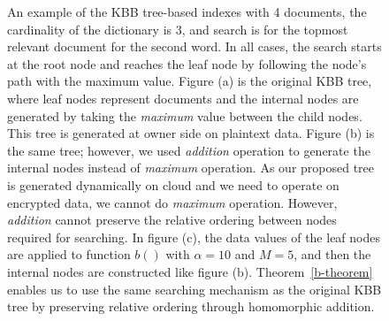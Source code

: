 \documentclass[sigconf,pdftex]{acmart}
\begin{document}
\begin{figure}[htb]
  \caption{\small{An example of the KBB tree-based indexes with 4 documents, the cardinality of the dictionary is 3, and search is for the topmost relevant document for the second word. In all cases, the search starts at the root node and reaches the leaf node by following the node's path with the maximum value. Figure (a) is the original KBB tree, where leaf nodes represent documents and the internal nodes are generated by taking the \textit{maximum} value between the child nodes. This tree is generated at owner side on plaintext data. Figure (b) is the same tree; however, we used \textit{addition} operation to generate the internal nodes instead of \textit{maximum} operation. As our proposed tree is generated dynamically on cloud and we need to operate on encrypted data, we cannot do \textit{maximum} operation. However, \textit{addition} cannot preserve the relative ordering between nodes required for searching. In figure (c), the data values of the leaf nodes are applied to function $b()$ with $\alpha = 10$ and $M = 5$, and then the internal nodes are constructed like figure (b). Theorem~\ref{b-theorem} enables us to use the same searching mechanism as the original KBB tree by preserving relative ordering through homomorphic addition.}}
\label{fig:treeWithB} 
\end{figure}
%   
  
  

  
  
  
\end{document}
